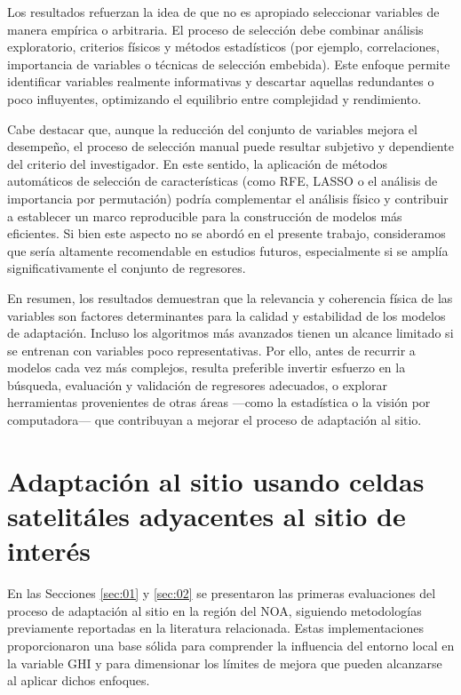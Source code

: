 \documentclass[letterpaper,12pt, twoside]{report}
\providecommand{\DIFdeltex}[1]{{\protect\color{red} \scriptsize #1}} %
\providecommand{\DIFdel}[1]{\texorpdfstring{\DIFdeltex{#1}}{}} %
\begin{document}
\DIFdel{Los resultados refuerzan la idea de que no es apropiado seleccionar variables de manera empírica o arbitraria. El proceso de selección debe combinar análisis exploratorio, criterios físicos y métodos estadísticos (por ejemplo, correlaciones, importancia de variables o técnicas de selección embebida). Este enfoque permite identificar variables realmente informativas y descartar aquellas redundantes o poco influyentes, optimizando el equilibrio entre complejidad y rendimiento.
}%

\DIFdel{Cabe destacar que, aunque la reducción del conjunto de variables mejora el desempeño, el proceso de selección manual puede resultar subjetivo y dependiente del criterio del investigador. En este sentido, la aplicación de métodos automáticos de selección de características (como RFE, LASSO o el análisis de importancia por permutación) podría complementar el análisis físico y contribuir a establecer un marco reproducible para la construcción de modelos más eficientes. Si bien este aspecto no se abordó en el presente trabajo, consideramos que sería altamente recomendable en estudios futuros, especialmente si se amplía significativamente el conjunto de regresores.
}%

\DIFdel{En resumen, los resultados demuestran que la relevancia y coherencia física de las variables son factores determinantes para la calidad y estabilidad de los modelos de adaptación. Incluso los algoritmos más avanzados tienen un alcance limitado si se entrenan con variables poco representativas. Por ello, antes de recurrir a modelos cada vez más complejos, resulta preferible invertir esfuerzo en la búsqueda, evaluación y validación de regresores adecuados, o explorar herramientas provenientes de otras áreas —como la estadística o la visión por computadora— que contribuyan a mejorar el proceso de adaptación al sitio.
}%

\section{\DIFdel{Adaptación al sitio usando celdas satelitáles adyacentes al sitio de interés}}%
\addtocounter{section}{-1}%

\DIFdel{En las Secciones \ref{sec:01} y \ref{sec:02} se presentaron las primeras evaluaciones del proceso de adaptación al sitio en la región del NOA, siguiendo metodologías previamente reportadas en la literatura relacionada. Estas implementaciones proporcionaron una base sólida para comprender la influencia del entorno local en la variable GHI y para dimensionar los límites de mejora que pueden alcanzarse al aplicar dichos enfoques.}%
\end{document}
